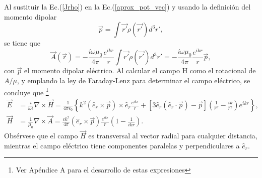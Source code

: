 Al sustituir la Ec.(\ref{Jrho}) en la Ec.(\ref{aprox_pot_vec}) y usando la definición del momento dipolar
\begin{equation*}
	\Vec{p}=\int \Vec{r'}\rho(\Vec{r'})d^3r',
\end{equation*}
se tiene que 
\begin{equation}
    \Vec{A}(\Vec{r})=-\frac{i\omega\mu_0}{4\pi}\frac{e^{ikr}}{r}\int \Vec{r'}\rho(\Vec{r'})d^3r'=-\frac{i\omega\mu_0}{4\pi}\frac{e^{ikr}}{r}\Vec{p} , 
    \label{A_dip}  
\end{equation}
con $\Vec{p}$ el momento dipolar eléctrico. Al calcular el campo H como el rotacional de $A/\mu$, y emplando la ley de Faraday-Lenz para determinar el campo eléctrico, se concluye que \footnote{Ver Apéndice A para el desarrollo de estas expresiones}
\begin{align}
	\Vec{E}&=\frac{i}{\omega\epsilon}\nabla\times\Vec{H}=\frac{1}{4\pi\epsilon_0}\left\{k^2(\hat{e}_r\times\Vec{p})\times\hat{e}_r\frac{e^{ikr}}{r}+[3\hat{e}_r(\hat{e}_r\cdot\Vec{p})-\Vec{p}]\left(\frac{1}{r^3}-\frac{ik}{r^2}\right)e^{ikr}\right\},\\
    \Vec{H}&=\frac{1}{\mu_0}\nabla\times\Vec{A}=\frac{ck^2}{4\pi}(\hat{e}_r\times\Vec{p})\frac{e^{ikr}}{r}\left(1-\frac{1}{ikr}\right).    
\end{align}
Obsérvese que el campo $\Vec{H}$ es transversal al vector radial para cualquier distancia, mientras el campo eléctrico tiene componentes paralelas y perpendiculares a $\hat{e}_r$.\\

